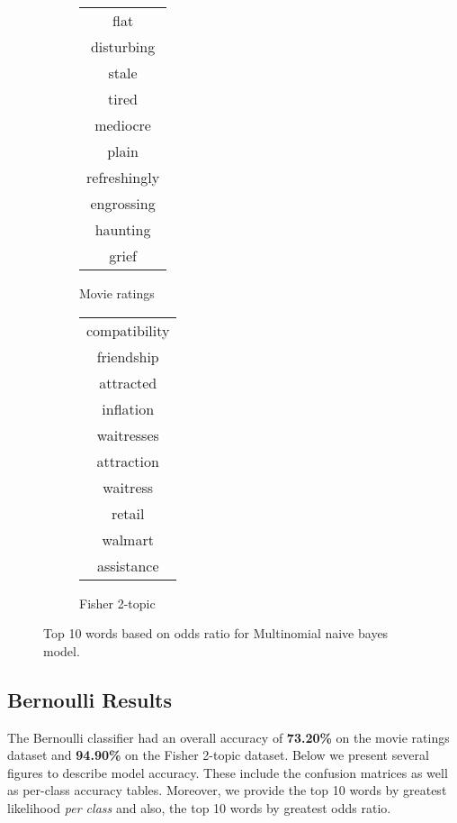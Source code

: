 \documentclass[10pt,a4paper]{article}
\begin{document}
\begin{figure}[H]
\centering
\begin{subfigure}{0.25\textwidth}
\begin{tabular}{|c|}
\hline
flat\\
disturbing\\
stale\\
tired\\
mediocre\\
plain\\
refreshingly\\
engrossing\\
haunting\\
grief\\
\hline
\end{tabular}
\caption{Movie ratings}
\end{subfigure}%
\begin{subfigure}{0.25\textwidth}
\begin{tabular}{|c|}
\hline
compatibility\\
friendship\\
attracted\\
inflation\\
waitresses\\
attraction\\
waitress\\
retail\\
walmart\\
assistance\\
\hline
\end{tabular}
\caption{Fisher 2-topic}
\end{subfigure}
\caption{Top 10 words based on odds ratio for Multinomial naive bayes model.}
\end{figure}

\subsection{Bernoulli Results}
The Bernoulli classifier had an overall accuracy of \textbf{73.20\%} on the movie ratings dataset and \textbf{94.90\%} on the Fisher 2-topic dataset. Below we present several figures to describe model accuracy. These include the confusion matrices as well as per-class accuracy tables. Moreover, we provide the top 10 words by greatest likelihood \emph{per class} and also, the top 10 words by greatest odds ratio.
\end{document}
